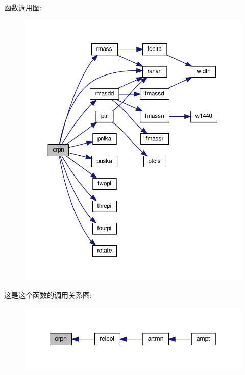 函数调用图\+:
\nopagebreak
\begin{figure}[H]
\begin{center}
\leavevmode
\includegraphics[width=350pt]{crpn_8f90_a9a3f8179163fab432b76e4ee2005c980_cgraph}
\end{center}
\end{figure}
这是这个函数的调用关系图\+:
\nopagebreak
\begin{figure}[H]
\begin{center}
\leavevmode
\includegraphics[width=342pt]{crpn_8f90_a9a3f8179163fab432b76e4ee2005c980_icgraph}
\end{center}
\end{figure}
